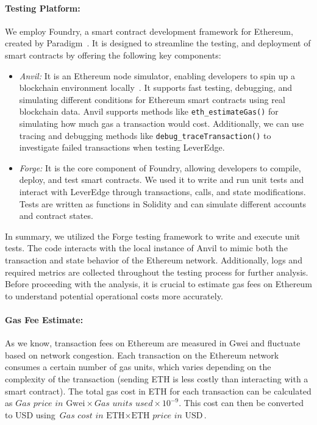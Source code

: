 \paragraph{Testing Platform:}
We employ Foundry, a smart contract development framework for Ethereum, created by Paradigm~\cite{Foundry_Doc}. It is designed to streamline the testing, and deployment of smart contracts by offering the following key components:
\begin{itemize}
	\item \textit{Anvil:} It is an Ethereum node simulator, enabling developers to spin up a blockchain environment locally~\cite{Foundry_Anvil}. It supports fast testing, debugging, and simulating different conditions for Ethereum smart contracts using real blockchain data. Anvil supports methods like \texttt{eth\_estimateGas()} for simulating how much gas a transaction would cost. Additionally, we can use tracing and debugging methods like \texttt{debug\_traceTransaction()} to investigate failed transactions when testing LeverEdge.
	
	\item \textit{Forge:} It is the core component of Foundry, allowing developers to compile, deploy, and test smart contracts. We used it to write and run unit tests and interact with LeverEdge through transactions, calls, and state modifications. Tests are written as functions in Solidity and can simulate different accounts and contract states.
\end{itemize}

In summary, we utilized the Forge testing framework to write and execute unit tests. The code interacts with the local instance of Anvil to mimic both the transaction and state behavior of the Ethereum network. Additionally, logs and required metrics are collected throughout the testing process for further analysis. Before proceeding with the analysis, it is crucial to estimate gas fees on Ethereum to understand potential operational costs more accurately.

\paragraph{Gas Fee Estimate:}
As we know, transaction fees on Ethereum are measured in Gwei and fluctuate based on network congestion. Each transaction on the Ethereum network consumes a certain number of gas units, which varies depending on the complexity of the transaction (\eg sending ETH is less costly than interacting with a smart contract). The total gas cost in ETH for each transaction can be calculated as \( \textit{Gas price in } \text{Gwei} \times \textit{Gas units used} \times 10^{-9} \). This cost can then be converted to USD using \( \textit{Gas cost in }\text{ETH} \times \text{ETH }\textit{price in }\text{USD} \).

